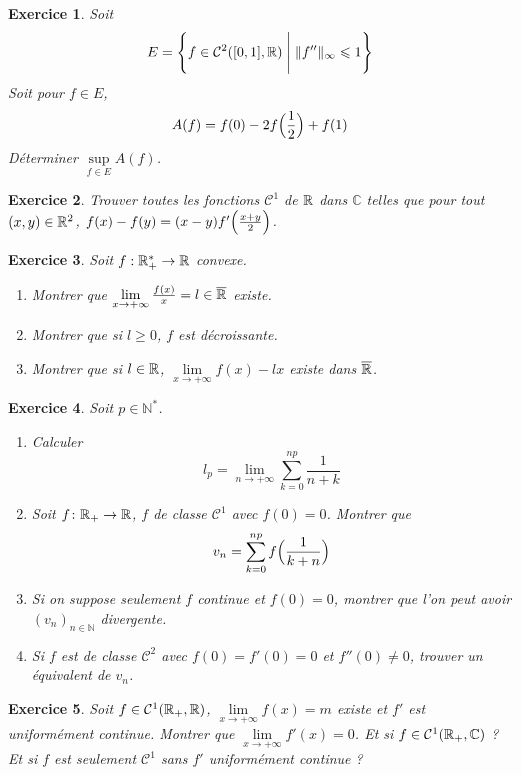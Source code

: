 \documentclass[12pt]{article}
\newtheorem{exercise}{Exercice}[section]
\theoremstyle{remark}
\theoremstyle{remark}
\newcommand{\C}{\mathbb{C}} \newcommand{\Q}{\mathbb{Q}}
\newcommand{\N}{\mathbb{N}} \newcommand{\Z}{\mathbb{Z}}
\begin{document}
\begin{exercise}
	Soit 
	$$E=\Biggl\{f\in\mathcal{C}^{2}([0,1],\mathbb{R})\Biggm|\Vert f''\Vert_{\infty}\leqslant 1\Biggr\}$$
	Soit pour $f\in E$,
	$$A(f)=f(0)-2f\Bigl(\frac{1}{2}\Bigr)+f(1)$$
	Déterminer $\sup\limits_{f\in E}A(f)$.
\end{exercise}

\begin{exercise}
	Trouver toutes les fonctions $\mathcal{C}^{1}$ de $\mathbb{R}$ dans $\C$ telles que pour tout $(x,y)\in\mathbb{R}^{2}$, $f(x)-f(y)=(x-y)f'\Bigl(\frac{x+y}{2}\Bigr)$.
\end{exercise}

\begin{exercise}
	Soit $f:\mathbb{R}_{+}^{*}\to\mathbb{R}$ convexe.
	\begin{enumerate}
		\item Montrer que $\lim\limits_{x\to+\infty}\frac{f(x)}{x}=l\in\overline{\mathbb{R}}$ existe.
		\item Montrer que si $l\geqslant0$, $f$ est décroissante.
		\item Montrer que si $l\in\mathbb{R}$, $\lim\limits_{x\to+\infty}f(x)-lx$ existe dans $\overline{\mathbb{R}}$.
	\end{enumerate}
\end{exercise}

\begin{exercise}
	Soit $p\in\N^{*}$.
	\begin{enumerate}
		\item Calculer 
		$$l_{p}=\lim\limits_{n\to+\infty}\sum_{k=0}^{np}\frac{1}{n+k}$$
		\item Soit $f\colon\mathbb{R}_{+}\to\mathbb{R}$, $f$ de classe $\mathcal{C}^{1}$ avec $f(0)=0$. Montrer que 
		$$v_{n}=\sum_{k=0}^{np}f\Bigl(\frac{1}{k+n}\Bigr)$$
		\item Si on suppose seulement $f$ continue et $f(0)=0$, montrer que l'on peut avoir $(v_{n})_{n\in\N}$ divergente.
		\item Si $f$ est de classe $\mathcal{C}^{2}$ avec $f(0)=f'(0)=0$ et $f''(0)\neq0$, trouver un équivalent de $v_{n}$.
	\end{enumerate}
\end{exercise}

\begin{exercise}
	Soit $f\in\mathcal{C}^{1}(\mathbb{R}_{+},\mathbb{R})$, $\lim\limits_{x\to+\infty}f(x)=m$ existe et $f'$ est uniformément continue. Montrer que $\lim\limits_{x\to+\infty}f'(x)=0$. Et si $f\in\mathcal{C}^{1}(\R_{+},\C)$ ? Et si $f$ est seulement $\mathcal{C}^{1}$ sans $f'$ uniformément continue ?
\end{exercise}
\end{document}
